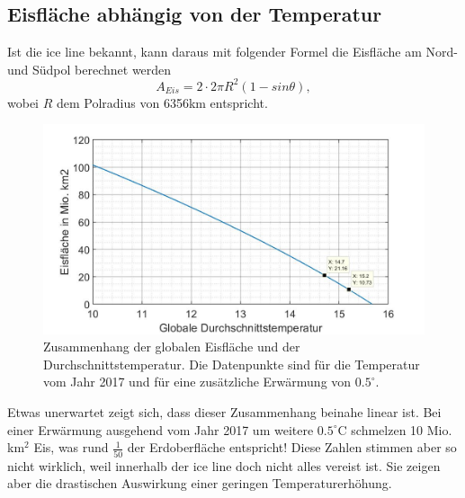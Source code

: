 \begin{refsection}
\subsection{Eisfläche abhängig von der Temperatur}
Ist die ice line bekannt, kann daraus mit folgender Formel die Eisfläche am Nord- und Südpol berechnet werden
\begin{equation} \label{Eisfläche}
	A_{Eis}=2\cdot 2\pi R^2(1-sin\theta),
\end{equation}
wobei $R$ dem Polradius von 6356km entspricht.
\begin{figure}[H]
	\centering
	\includegraphics[width=14cm]{eis/Eisflaeche_abh_von_der_Temperatur.jpg}
	\caption{Zusammenhang der globalen Eisfläche und der Durchschnittstemperatur. Die Datenpunkte sind für die Temperatur vom Jahr 2017 und für eine zusätzliche Erwärmung von $0.5^{\circ}$.}
\end{figure}
Etwas unerwartet zeigt sich, dass dieser Zusammenhang beinahe linear ist. Bei einer Erwärmung ausgehend vom Jahr 2017 um weitere $0.5^{\circ}$C schmelzen 10 Mio. km$^2$ Eis, was rund $\tfrac{1}{50}$ der Erdoberfläche entspricht! Diese Zahlen stimmen aber so nicht wirklich, weil innerhalb der ice line doch nicht alles vereist ist. Sie zeigen aber die drastischen Auswirkung einer geringen Temperaturerhöhung.

\end{refsection}
